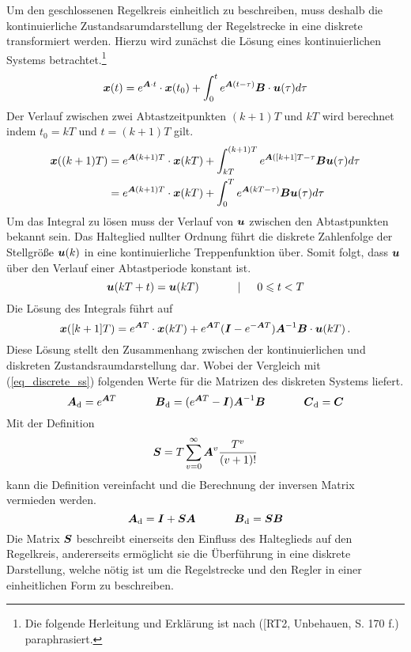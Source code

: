 Um den geschlossenen Regelkreis einheitlich zu beschreiben, muss deshalb die kontinuierliche Zustandsarumdarstellung der Regelstrecke in eine diskrete transformiert werden. Hierzu wird zunächst die Lösung eines kontinuierlichen Systems  betrachtet.\footnote{Die folgende Herleitung und Erklärung ist nach ([RT2, Unbehauen, S. 170 f.) paraphrasiert.}
\begin{equation}
\boldsymbol{x}(t) = e^{\boldsymbol{A}\cdot t}\cdot \boldsymbol{x}(t_0) + \int^t_0 e^{\boldsymbol{A}(t-\tau)}\boldsymbol{B}\cdot \boldsymbol{u}(\tau)d\tau
\end{equation}
Der Verlauf zwischen zwei Abtastzeitpunkten $(k+1)T$ und $kT$ wird berechnet indem $t_0=kT$ und $t=(k+1)T$ gilt.
\begin{equation}
\begin{split}
\boldsymbol{x}( (k+1)T) &= e^{\boldsymbol{A}(k+1)T}\cdot \boldsymbol{x}(kT) + \int^{(k+1)T}_{kT} e^{\boldsymbol{A}([k+1]T-\tau}\boldsymbol{B}\boldsymbol{u}(\tau)d\tau \\
&= e^{\boldsymbol{A}(k+1)T}\cdot \boldsymbol{x}(kT) + \int^T_0 e^{\boldsymbol{A}(kT-\tau)}\boldsymbol{B}\boldsymbol{u}(\tau)d\tau
\end{split}
\end{equation}
Um das Integral zu lösen muss der Verlauf von $\boldsymbol{u}$ zwischen den Abtastpunkten bekannt sein. Das Halteglied nullter Ordnung führt die diskrete Zahlenfolge der Stellgröße $\boldsymbol{u}(k)$ in eine kontinuierliche Treppenfunktion über. Somit folgt, dass $\boldsymbol{u}$ über den Verlauf einer Abtastperiode konstant ist.
\begin{equation}
\boldsymbol{u}(kT+t) = \boldsymbol{u}(kT) \hspace{35pt} \vert \hspace{15pt} 0 \leqslant t < T
\end{equation}
Die Lösung des Integrals führt auf
\begin{equation}
\boldsymbol{x}([k+1]T) = e^{\boldsymbol{A}T}\cdot \boldsymbol{x}(kT) + e^{\boldsymbol{A}T}(\boldsymbol{I}-e^{-\boldsymbol{A}T})\boldsymbol{A}^{-1}\boldsymbol{B}\cdot \boldsymbol{u}(kT)\,.
\end{equation}
Diese Lösung stellt den Zusammenhang zwischen der kontinuierlichen und diskreten Zustandsraumdarstellung dar. Wobei der Vergleich mit (\ref{eq_discrete_ss}) folgenden Werte für die Matrizen des diskreten Systems  liefert.
\begin{equation}
\boldsymbol{A}_{\text{d}} = e^{\boldsymbol{A}T} \hspace{35pt} \boldsymbol{B}_{\text{d}} = (e^{\boldsymbol{A}T}-\boldsymbol{I})\boldsymbol{A}^{-1}\boldsymbol{B} \hspace{35pt} \boldsymbol{C}_{\text{d}} = \boldsymbol{C}
\end{equation}
Mit der Definition
\begin{equation}
\boldsymbol{S} = T \sum^{\infty}_{v=0}\boldsymbol{A}^v\frac{T^v}{(v+1)!}
\end{equation}
kann die Definition vereinfacht und die Berechnung der inversen Matrix vermieden werden.
\begin{equation}
\boldsymbol{A}_{\text{d}} = \boldsymbol{I}+\boldsymbol{S}\boldsymbol{A}\hspace{35pt} \boldsymbol{B}_{\text{d}} = \boldsymbol{SB}
\end{equation}
Die Matrix $\boldsymbol{S}$ beschreibt einerseits den Einfluss des Halteglieds auf den Regelkreis, andererseits ermöglicht sie die Überführung in eine diskrete Darstellung, welche nötig ist um die Regelstrecke und den Regler in einer einheitlichen Form zu beschreiben. 